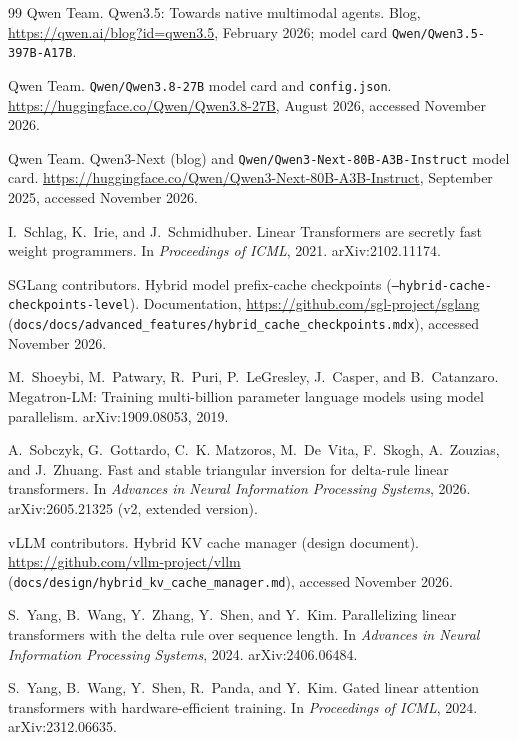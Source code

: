 \documentclass[11pt]{article}
\theoremstyle{remark}
\begin{document}
\begin{thebibliography}{99}
Qwen Team.
\newblock Qwen3.5: Towards native multimodal agents.
\newblock Blog, \url{https://qwen.ai/blog?id=qwen3.5}, February 2026; model card \texttt{Qwen/Qwen3.5-397B-A17B}.

Qwen Team.
\newblock \texttt{Qwen/Qwen3.8-27B} model card and \texttt{config.json}.
\newblock \url{https://huggingface.co/Qwen/Qwen3.8-27B}, August 2026, accessed November 2026.

Qwen Team.
\newblock Qwen3-Next (blog) and \texttt{Qwen/Qwen3-Next-80B-A3B-Instruct} model card.
\newblock \url{https://huggingface.co/Qwen/Qwen3-Next-80B-A3B-Instruct}, September 2025, accessed November 2026.

I.~Schlag, K.~Irie, and J.~Schmidhuber.
\newblock Linear Transformers are secretly fast weight programmers.
\newblock In \emph{Proceedings of ICML}, 2021. arXiv:2102.11174.

SGLang contributors.
\newblock Hybrid model prefix-cache checkpoints (\texttt{--hybrid-cache-checkpoints-level}).
\newblock Documentation, \url{https://github.com/sgl-project/sglang} (\texttt{docs/docs/advanced\_features/hybrid\_cache\_checkpoints.mdx}),
accessed November 2026.

M.~Shoeybi, M.~Patwary, R.~Puri, P.~LeGresley, J.~Casper, and B.~Catanzaro.
\newblock Megatron-LM: Training multi-billion parameter language models using model parallelism.
\newblock arXiv:1909.08053, 2019.

A.~Sobczyk, G.~Gottardo, C.~K. Matzoros, M.~De~Vita, F.~Skogh, A.~Zouzias, and J.~Zhuang.
\newblock Fast and stable triangular inversion for delta-rule linear transformers.
\newblock In \emph{Advances in Neural Information Processing Systems}, 2026. arXiv:2605.21325 (v2, extended version).

vLLM contributors.
\newblock Hybrid KV cache manager (design document).
\newblock \url{https://github.com/vllm-project/vllm} (\texttt{docs/design/hybrid\_kv\_cache\_manager.md}), accessed November 2026.

S.~Yang, B.~Wang, Y.~Zhang, Y.~Shen, and Y.~Kim.
\newblock Parallelizing linear transformers with the delta rule over sequence length.
\newblock In \emph{Advances in Neural Information Processing Systems}, 2024. arXiv:2406.06484.

S.~Yang, B.~Wang, Y.~Shen, R.~Panda, and Y.~Kim.
\newblock Gated linear attention transformers with hardware-efficient training.
\newblock In \emph{Proceedings of ICML}, 2024. arXiv:2312.06635.


\end{thebibliography}
\end{document}
